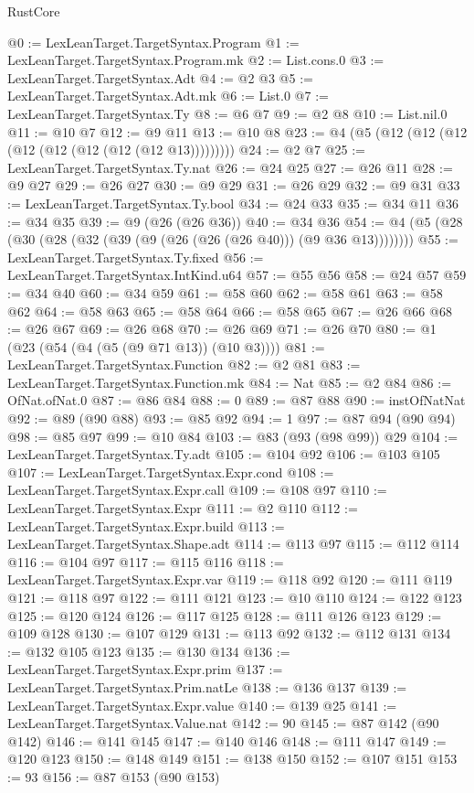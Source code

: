 \begin{lexlean}{RustCore}
\begin{coremodule}
@0 := LexLeanTarget.TargetSyntax.Program
@1 := LexLeanTarget.TargetSyntax.Program.mk
@2 := List.cons.{0}
@3 := LexLeanTarget.TargetSyntax.Adt
@4 := @2 @3
@5 := LexLeanTarget.TargetSyntax.Adt.mk
@6 := List.{0}
@7 := LexLeanTarget.TargetSyntax.Ty
@8 := @6 @7
@9 := @2 @8
@10 := List.nil.{0}
@11 := @10 @7
@12 := @9 @11
@13 := @10 @8
@23 := @4 (@5 (@12 (@12 (@12 (@12 (@12 (@12 (@12 (@12 @13)))))))))
@24 := @2 @7
@25 := LexLeanTarget.TargetSyntax.Ty.nat
@26 := @24 @25
@27 := @26 @11
@28 := @9 @27
@29 := @26 @27
@30 := @9 @29
@31 := @26 @29
@32 := @9 @31
@33 := LexLeanTarget.TargetSyntax.Ty.bool
@34 := @24 @33
@35 := @34 @11
@36 := @34 @35
@39 := @9 (@26 (@26 @36))
@40 := @34 @36
@54 := @4 (@5 (@28 (@30 (@28 (@32 (@39 (@9 (@26 (@26 (@26 @40))) (@9 @36 @13))))))))
@55 := LexLeanTarget.TargetSyntax.Ty.fixed
@56 := LexLeanTarget.TargetSyntax.IntKind.u64
@57 := @55 @56
@58 := @24 @57
@59 := @34 @40
@60 := @34 @59
@61 := @58 @60
@62 := @58 @61
@63 := @58 @62
@64 := @58 @63
@65 := @58 @64
@66 := @58 @65
@67 := @26 @66
@68 := @26 @67
@69 := @26 @68
@70 := @26 @69
@71 := @26 @70
@80 := @1 (@23 (@54 (@4 (@5 (@9 @71 @13)) (@10 @3))))
@81 := LexLeanTarget.TargetSyntax.Function
@82 := @2 @81
@83 := LexLeanTarget.TargetSyntax.Function.mk
@84 := Nat
@85 := @2 @84
@86 := OfNat.ofNat.{0}
@87 := @86 @84
@88 := 0
@89 := @87 @88
@90 := instOfNatNat
@92 := @89 (@90 @88)
@93 := @85 @92
@94 := 1
@97 := @87 @94 (@90 @94)
@98 := @85 @97
@99 := @10 @84
@103 := @83 (@93 (@98 @99)) @29
@104 := LexLeanTarget.TargetSyntax.Ty.adt
@105 := @104 @92
@106 := @103 @105
@107 := LexLeanTarget.TargetSyntax.Expr.cond
@108 := LexLeanTarget.TargetSyntax.Expr.call
@109 := @108 @97
@110 := LexLeanTarget.TargetSyntax.Expr
@111 := @2 @110
@112 := LexLeanTarget.TargetSyntax.Expr.build
@113 := LexLeanTarget.TargetSyntax.Shape.adt
@114 := @113 @97
@115 := @112 @114
@116 := @104 @97
@117 := @115 @116
@118 := LexLeanTarget.TargetSyntax.Expr.var
@119 := @118 @92
@120 := @111 @119
@121 := @118 @97
@122 := @111 @121
@123 := @10 @110
@124 := @122 @123
@125 := @120 @124
@126 := @117 @125
@128 := @111 @126 @123
@129 := @109 @128
@130 := @107 @129
@131 := @113 @92
@132 := @112 @131
@134 := @132 @105 @123
@135 := @130 @134
@136 := LexLeanTarget.TargetSyntax.Expr.prim
@137 := LexLeanTarget.TargetSyntax.Prim.natLe
@138 := @136 @137
@139 := LexLeanTarget.TargetSyntax.Expr.value
@140 := @139 @25
@141 := LexLeanTarget.TargetSyntax.Value.nat
@142 := 90
@145 := @87 @142 (@90 @142)
@146 := @141 @145
@147 := @140 @146
@148 := @111 @147
@149 := @120 @123
@150 := @148 @149
@151 := @138 @150
@152 := @107 @151
@153 := 93
@156 := @87 @153 (@90 @153)

\end{coremodule}
\end{lexlean}
